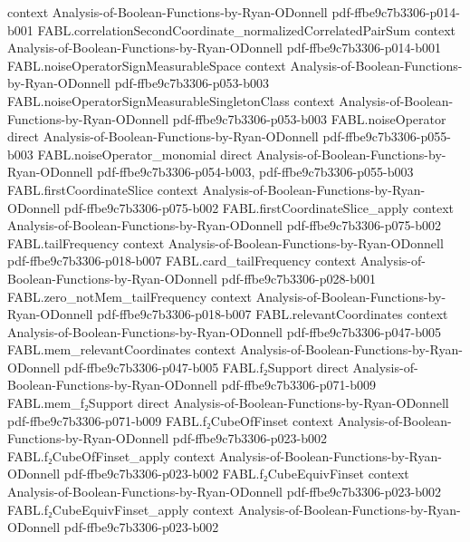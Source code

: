 \begin{theorem}
  {context}
  {Analysis-of-Boolean-Functions-by-Ryan-ODonnell}
  {pdf-ffbe9c7b3306-p014-b001}
\proofstep
  {FABL.correlationSecondCoordinate_normalizedCorrelatedPairSum}
  {context}
  {Analysis-of-Boolean-Functions-by-Ryan-ODonnell}
  {pdf-ffbe9c7b3306-p014-b001}
\proofstep
  {FABL.noiseOperatorSignMeasurableSpace}
  {context}
  {Analysis-of-Boolean-Functions-by-Ryan-ODonnell}
  {pdf-ffbe9c7b3306-p053-b003}
\proofstep
  {FABL.noiseOperatorSignMeasurableSingletonClass}
  {context}
  {Analysis-of-Boolean-Functions-by-Ryan-ODonnell}
  {pdf-ffbe9c7b3306-p053-b003}
\proofstep
  {FABL.noiseOperator}
  {direct}
  {Analysis-of-Boolean-Functions-by-Ryan-ODonnell}
  {pdf-ffbe9c7b3306-p055-b003}
\proofstep
  {FABL.noiseOperator_monomial}
  {direct}
  {Analysis-of-Boolean-Functions-by-Ryan-ODonnell}
  {pdf-ffbe9c7b3306-p054-b003,
    pdf-ffbe9c7b3306-p055-b003}
\proofstep
  {FABL.firstCoordinateSlice}
  {context}
  {Analysis-of-Boolean-Functions-by-Ryan-ODonnell}
  {pdf-ffbe9c7b3306-p075-b002}
\proofstep
  {FABL.firstCoordinateSlice_apply}
  {context}
  {Analysis-of-Boolean-Functions-by-Ryan-ODonnell}
  {pdf-ffbe9c7b3306-p075-b002}
\proofstep
  {FABL.tailFrequency}
  {context}
  {Analysis-of-Boolean-Functions-by-Ryan-ODonnell}
  {pdf-ffbe9c7b3306-p018-b007}
\proofstep
  {FABL.card_tailFrequency}
  {context}
  {Analysis-of-Boolean-Functions-by-Ryan-ODonnell}
  {pdf-ffbe9c7b3306-p028-b001}
\proofstep
  {FABL.zero_notMem_tailFrequency}
  {context}
  {Analysis-of-Boolean-Functions-by-Ryan-ODonnell}
  {pdf-ffbe9c7b3306-p018-b007}
\proofstep
  {FABL.relevantCoordinates}
  {context}
  {Analysis-of-Boolean-Functions-by-Ryan-ODonnell}
  {pdf-ffbe9c7b3306-p047-b005}
\proofstep
  {FABL.mem_relevantCoordinates}
  {context}
  {Analysis-of-Boolean-Functions-by-Ryan-ODonnell}
  {pdf-ffbe9c7b3306-p047-b005}
\proofstep
  {FABL.f₂Support}
  {direct}
  {Analysis-of-Boolean-Functions-by-Ryan-ODonnell}
  {pdf-ffbe9c7b3306-p071-b009}
\proofstep
  {FABL.mem_f₂Support}
  {direct}
  {Analysis-of-Boolean-Functions-by-Ryan-ODonnell}
  {pdf-ffbe9c7b3306-p071-b009}
\proofstep
  {FABL.f₂CubeOfFinset}
  {context}
  {Analysis-of-Boolean-Functions-by-Ryan-ODonnell}
  {pdf-ffbe9c7b3306-p023-b002}
\proofstep
  {FABL.f₂CubeOfFinset_apply}
  {context}
  {Analysis-of-Boolean-Functions-by-Ryan-ODonnell}
  {pdf-ffbe9c7b3306-p023-b002}
\proofstep
  {FABL.f₂CubeEquivFinset}
  {context}
  {Analysis-of-Boolean-Functions-by-Ryan-ODonnell}
  {pdf-ffbe9c7b3306-p023-b002}
\proofstep
  {FABL.f₂CubeEquivFinset_apply}
  {context}
  {Analysis-of-Boolean-Functions-by-Ryan-ODonnell}
  {pdf-ffbe9c7b3306-p023-b002}
\proofstep

\end{theorem}
